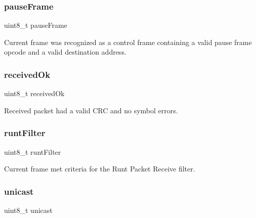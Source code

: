 \mbox{\label{struct_r_s_v__t_a1a7098c480755c10613115cc181aa126}} 
\subsubsection{\texorpdfstring{pauseFrame}{pauseFrame}}
{\footnotesize\ttfamily uint8\+\_\+t pause\+Frame}



Current frame was recognized as a control frame containing a valid pause frame opcode and a valid destination address. 

\mbox{\label{struct_r_s_v__t_a864bac3376c79921741bdde1db0d7570}} 
\subsubsection{\texorpdfstring{receivedOk}{receivedOk}}
{\footnotesize\ttfamily uint8\+\_\+t received\+Ok}



Received packet had a valid C\+RC and no symbol errors. 

\mbox{\label{struct_r_s_v__t_a27d64356a19179a097c7973f7d7a46a5}} 
\subsubsection{\texorpdfstring{runtFilter}{runtFilter}}
{\footnotesize\ttfamily uint8\+\_\+t runt\+Filter}



Current frame met criteria for the Runt Packet Receive filter. 

\mbox{\label{struct_r_s_v__t_ab2a20bde35ec4242bf38d69c8277114a}} 
\subsubsection{\texorpdfstring{unicast}{unicast}}
{\footnotesize\ttfamily uint8\+\_\+t unicast}



